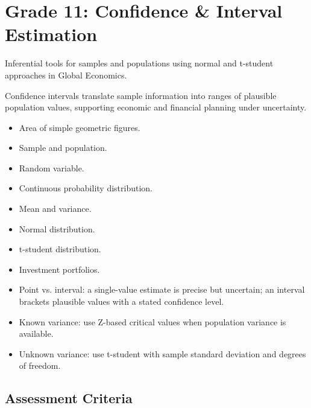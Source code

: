 \section{Grade 11: Confidence \& Interval Estimation}\label{sec:grade11-confidence}

Inferential tools for samples and populations using normal and t-student approaches in Global Economics.

Confidence intervals translate sample information into ranges of plausible population values, supporting economic and financial planning under uncertainty.

\begin{itemize}
	\item Area of simple geometric figures.
	\item Sample and population.
	\item Random variable.
	\item Continuous probability distribution.
	\item Mean and variance.
	\item Normal distribution.
	\item t-student distribution.
	\item Investment portfolios.
\end{itemize}

\begin{itemize}
	\item Point vs. interval: a single-value estimate is precise but uncertain; an interval brackets plausible values with a stated confidence level.
	\item Known variance: use Z-based critical values when population variance is available.
	\item Unknown variance: use t-student with sample standard deviation and degrees of freedom.
\end{itemize}

\subsection{Assessment Criteria}\label{sec:assessment-criteria-intervals}

